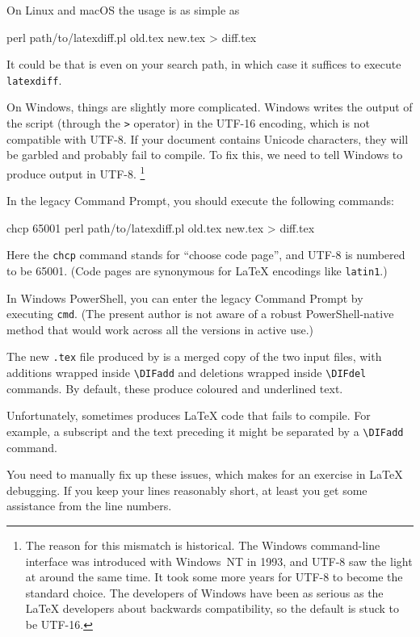 On Linux and macOS the usage is as simple as
\begin{ExampleCode}
perl path/to/latexdiff.pl old.tex new.tex > diff.tex
\end{ExampleCode}
It could be that  is even on your search path,
in which case it suffices to execute \verb|latexdiff|.

On Windows, things are slightly more complicated.
Windows writes the output of the script (through the \verb|>| operator)
in the UTF-16 encoding, which is not compatible with UTF-8.
If your document contains Unicode characters,
they will be garbled and probably fail to compile.
To fix this, we need to tell Windows to produce output in UTF-8.%
\footnote{The reason for this mismatch is historical.
The Windows command-line interface was introduced with Windows~NT in 1993,
and UTF-8 saw the light at around the same time.
It took some more years for UTF-8 to become the standard choice.
The developers of Windows have been as serious as the \LaTeX{} developers about backwards compatibility,
so the default is stuck to be UTF-16.}

In the legacy Command Prompt, you should execute the following commands:
\begin{ExampleCode}
chcp 65001
perl path/to/latexdiff.pl old.tex new.tex > diff.tex
\end{ExampleCode}
Here the \verb|chcp| command stands for ``choose code page'',
and UTF-8 is numbered to be 65001.
(Code pages are synonymous for \LaTeX{} encodings like \verb|latin1|.)

In Windows PowerShell, you can enter the legacy Command Prompt by executing \verb|cmd|.
(The present author is not aware of a robust PowerShell-native method that would work across
all the versions in active use.)

The new \verb|.tex| file produced by 
is a merged copy of the two input files,
with additions wrapped inside \verb|\DIFadd|
and deletions wrapped inside \verb|\DIFdel| commands.
By default, these produce coloured and underlined text.

\begin{gotcha}
Unfortunately,  sometimes produces \LaTeX{} code that fails to compile.
For example, a subscript and the text preceding it might be separated by a \verb|\DIFadd| command.

You need to manually fix up these issues,
which makes for an exercise in \LaTeX{} debugging.
If you keep your lines reasonably short,
at least you get some assistance from the line numbers.

\end{gotcha}

